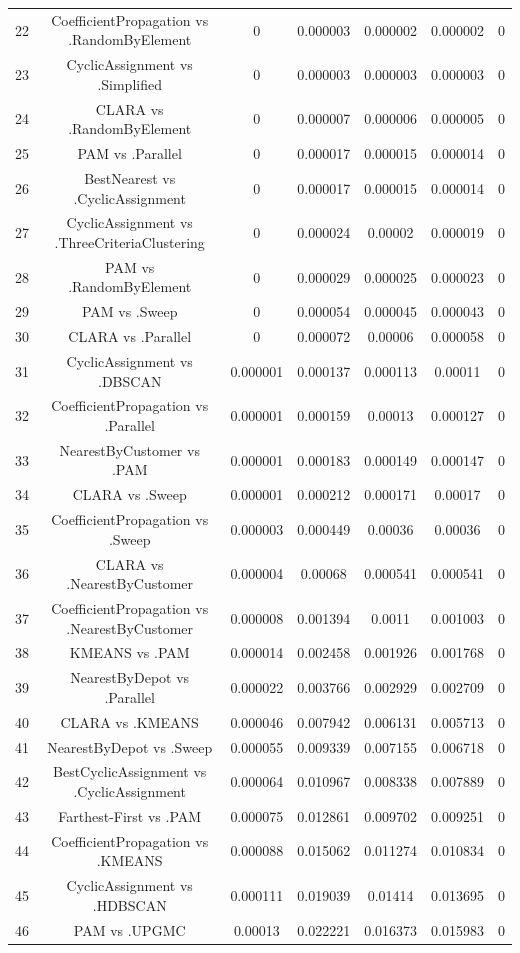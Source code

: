 \documentclass[a4paper,10pt]{article}
\begin{document}
\begin{landscape}
\begin{table}[!htp]
\begin{tabular}{ccccccc}
22&CoefficientPropagation vs .RandomByElement&0&0.000003&0.000002&0.000002&0\\
23&CyclicAssignment vs .Simplified&0&0.000003&0.000003&0.000003&0\\
24&CLARA vs .RandomByElement&0&0.000007&0.000006&0.000005&0\\
25&PAM vs .Parallel&0&0.000017&0.000015&0.000014&0\\
26&BestNearest vs .CyclicAssignment&0&0.000017&0.000015&0.000014&0\\
27&CyclicAssignment vs .ThreeCriteriaClustering&0&0.000024&0.00002&0.000019&0\\
28&PAM vs .RandomByElement&0&0.000029&0.000025&0.000023&0\\
29&PAM vs .Sweep&0&0.000054&0.000045&0.000043&0\\
30&CLARA vs .Parallel&0&0.000072&0.00006&0.000058&0\\
31&CyclicAssignment vs .DBSCAN&0.000001&0.000137&0.000113&0.00011&0\\
32&CoefficientPropagation vs .Parallel&0.000001&0.000159&0.00013&0.000127&0\\
33&NearestByCustomer vs .PAM&0.000001&0.000183&0.000149&0.000147&0\\
34&CLARA vs .Sweep&0.000001&0.000212&0.000171&0.00017&0\\
35&CoefficientPropagation vs .Sweep&0.000003&0.000449&0.00036&0.00036&0\\
36&CLARA vs .NearestByCustomer&0.000004&0.00068&0.000541&0.000541&0\\
37&CoefficientPropagation vs .NearestByCustomer&0.000008&0.001394&0.0011&0.001003&0\\
38&KMEANS vs .PAM&0.000014&0.002458&0.001926&0.001768&0\\
39&NearestByDepot vs .Parallel&0.000022&0.003766&0.002929&0.002709&0\\
40&CLARA vs .KMEANS&0.000046&0.007942&0.006131&0.005713&0\\
41&NearestByDepot vs .Sweep&0.000055&0.009339&0.007155&0.006718&0\\
42&BestCyclicAssignment vs .CyclicAssignment&0.000064&0.010967&0.008338&0.007889&0\\
43&Farthest-First vs .PAM&0.000075&0.012861&0.009702&0.009251&0\\
44&CoefficientPropagation vs .KMEANS&0.000088&0.015062&0.011274&0.010834&0\\
45&CyclicAssignment vs .HDBSCAN&0.000111&0.019039&0.01414&0.013695&0\\
46&PAM vs .UPGMC&0.00013&0.022221&0.016373&0.015983&0\\

\end{tabular}
\end{table}
\end{landscape}
\end{document}
